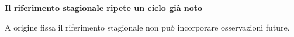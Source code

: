 \documentclass[12pt,aspectratio=1610]{beamer}
\begin{document}
\begin{frame}[plain]\hypertarget{slide14}{}
\begin{lrbox}{\TitleBox}
\begin{minipage}[t]{17.7cm}\raggedright\color{Ink}\fontsize{11.3}{14.8}\selectfont
\color{Navy}\bfseries\fontsize{20.6}{24.5}\selectfont Il riferimento stagionale ripete un ciclo già noto
\end{minipage}\end{lrbox}

\begin{lrbox}{\RecallBox}
\begin{minipage}[t]{14.3cm}\raggedright\color{Ink}\fontsize{11.3}{14.8}\selectfont
\fontsize{10.3}{13.8}\selectfont A origine fissa il riferimento stagionale non può incorporare osservazioni future.
\end{minipage}\end{lrbox}


\end{frame}
\end{document}
